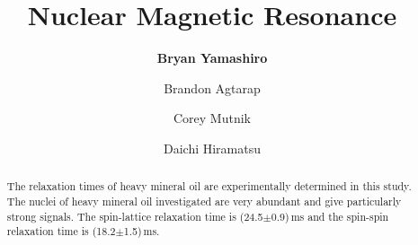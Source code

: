 \documentclass[aps,prl,twocolumn,superscriptaddress,nofootinbib]{revtex4-1}
\begin{document}





\title{Nuclear Magnetic Resonance}


\author{\textbf{Bryan Yamashiro}}
\author{Brandon Agtarap}
\author{Corey Mutnik}
\author{Daichi Hiramatsu}






\begin{abstract}

The relaxation times of heavy mineral oil are experimentally determined in this study. The nuclei of heavy mineral oil investigated are very abundant and give particularly strong signals.
The spin-lattice relaxation time is (24.5$\pm$0.9)\,ms and the spin-spin relaxation time is (18.2$\pm$1.5)\,ms.




\end{abstract}

\maketitle    %
\end{document}
